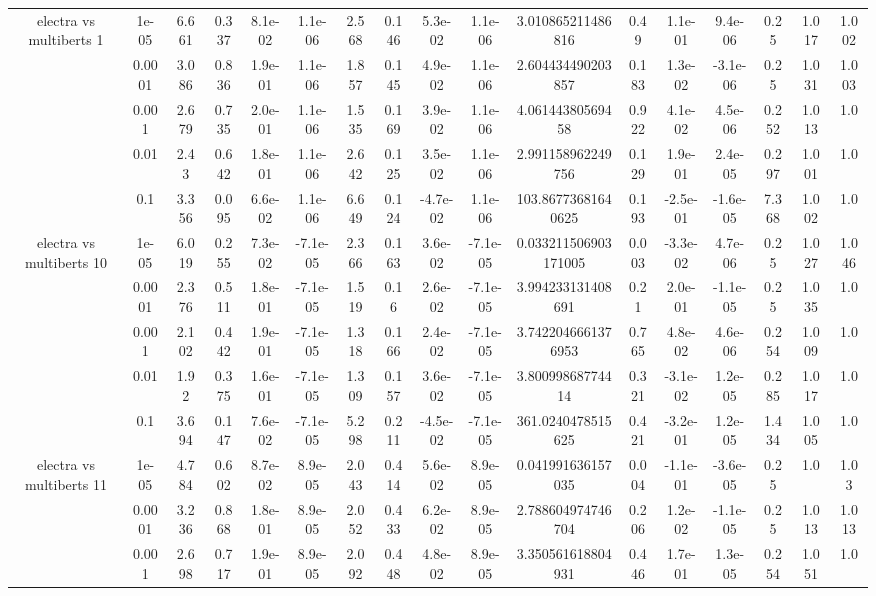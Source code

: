\begin{tabular}{|c|c|c|c|c|c|c|c|c|c|c|c|c|c|c|c|c|}
\hline
\multirow{5}{*}{electra  vs multiberts 1} & 1e-05 & 6.661 & 0.337 & 8.1e-02 & 1.1e-06 & 2.568 & 0.146 & 5.3e-02 & 1.1e-06 & 3.010865211486816 & 0.49 & 1.1e-01 & 9.4e-06 & 0.25 & 1.017 & 1.002 \\
 & 0.0001 & 3.086 & 0.836 & 1.9e-01 & 1.1e-06 & 1.857 & 0.145 & 4.9e-02 & 1.1e-06 & 2.604434490203857 & 0.183 & 1.3e-02 & -3.1e-06 & 0.25 & 1.031 & 1.003 \\
 & 0.001 & 2.679 & 0.735 & 2.0e-01 & 1.1e-06 & 1.535 & 0.169 & 3.9e-02 & 1.1e-06 & 4.06144380569458 & 0.922 & 4.1e-02 & 4.5e-06 & 0.252 & 1.013 & 1.0 \\
 & 0.01 & 2.43 & 0.642 & 1.8e-01 & 1.1e-06 & 2.642 & 0.125 & 3.5e-02 & 1.1e-06 & 2.991158962249756 & 0.129 & 1.9e-01 & 2.4e-05 & 0.297 & 1.001 & 1.0 \\
 & 0.1 & 3.356 & 0.095 & 6.6e-02 & 1.1e-06 & 6.649 & 0.124 & -4.7e-02 & 1.1e-06 & 103.86773681640625 & 0.193 & -2.5e-01 & -1.6e-05 & 7.368 & 1.002 & 1.0 \\
\hline
\multirow{5}{*}{electra  vs multiberts 10} & 1e-05 & 6.019 & 0.255 & 7.3e-02 & -7.1e-05 & 2.366 & 0.163 & 3.6e-02 & -7.1e-05 & 0.033211506903171005 & 0.003 & -3.3e-02 & 4.7e-06 & 0.25 & 1.027 & 1.046 \\
 & 0.0001 & 2.376 & 0.511 & 1.8e-01 & -7.1e-05 & 1.519 & 0.16 & 2.6e-02 & -7.1e-05 & 3.994233131408691 & 0.21 & 2.0e-01 & -1.1e-05 & 0.25 & 1.035 & 1.0 \\
 & 0.001 & 2.102 & 0.442 & 1.9e-01 & -7.1e-05 & 1.318 & 0.166 & 2.4e-02 & -7.1e-05 & 3.7422046661376953 & 0.765 & 4.8e-02 & 4.6e-06 & 0.254 & 1.009 & 1.0 \\
 & 0.01 & 1.92 & 0.375 & 1.6e-01 & -7.1e-05 & 1.309 & 0.157 & 3.6e-02 & -7.1e-05 & 3.80099868774414 & 0.321 & -3.1e-02 & 1.2e-05 & 0.285 & 1.017 & 1.0 \\
 & 0.1 & 3.694 & 0.147 & 7.6e-02 & -7.1e-05 & 5.298 & 0.211 & -4.5e-02 & -7.1e-05 & 361.0240478515625 & 0.421 & -3.2e-01 & 1.2e-05 & 1.434 & 1.005 & 1.0 \\
\hline
\multirow{5}{*}{electra  vs multiberts 11} & 1e-05 & 4.784 & 0.602 & 8.7e-02 & 8.9e-05 & 2.043 & 0.414 & 5.6e-02 & 8.9e-05 & 0.041991636157035 & 0.004 & -1.1e-01 & -3.6e-05 & 0.25 & 1.0 & 1.03 \\
 & 0.0001 & 3.236 & 0.868 & 1.8e-01 & 8.9e-05 & 2.052 & 0.433 & 6.2e-02 & 8.9e-05 & 2.788604974746704 & 0.206 & 1.2e-02 & -1.1e-05 & 0.25 & 1.013 & 1.013 \\
 & 0.001 & 2.698 & 0.717 & 1.9e-01 & 8.9e-05 & 2.092 & 0.448 & 4.8e-02 & 8.9e-05 & 3.350561618804931 & 0.446 & 1.7e-01 & 1.3e-05 & 0.254 & 1.051 & 1.0 \\

\end{tabular}
